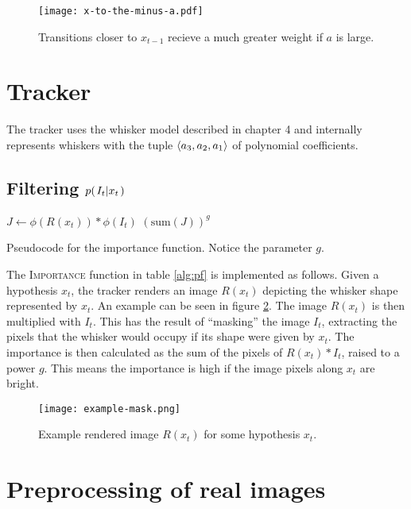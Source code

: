 \begin{figure}[ht]
  \centering
  \texttt{[image: x-to-the-minus-a.pdf]}
  \caption{Transitions closer to $x_{t-1}$ recieve a much greater
    weight if $a$ is large.}
  \label{fig:x-to-the-minus-a}
\end{figure}

\section{Tracker}

The tracker uses the whisker model described in chapter 4 and
internally represents whiskers with the tuple $\langle a_3, a_2, a_1 \rangle$ of polynomial
coefficients.

\subsection{Filtering $p{(\left. I_t \middle\vert x_t \right.)}$}
\label{sec:filtering}

\begin{table}[h]
  \begin{codebox}
    \li $ J \gets \phi(R(x_t)) * \phi(I_t)$
    \li \Return $\left(\mathrm{sum}(J)\right)^g$
  \end{codebox}
  \caption{Pseudocode for the importance function. Notice the parameter $g$.}
  \label{alg:importance}
\end{table}

The \textsc{Importance} function in table \ref{alg:pf} is implemented
as follows. Given a hypothesis $x_t$, the tracker renders an image
$R(x_t)$ depicting the whisker shape represented by $x_t$. An example
can be seen in figure \ref{fig:example-mask}. The image $R(x_t)$ is
then multiplied with $I_t$. This has the result of ``masking'' the
image $I_t$, extracting the pixels that the whisker would occupy if
its shape were given by $x_t$. The importance is then calculated as
the sum of the pixels of $R(x_t) * I_t$, raised to a power $g$. This
means the importance is high if the image pixels along $x_t$ are
bright.

\begin{figure}[h]
  \centering
  \texttt{[image: example-mask.png]}
  \caption{Example rendered image $R(x_t)$ for some hypothesis $x_t$.}
  \label{fig:example-mask}
\end{figure}

\section{Preprocessing of real images}
\label{prep-real}

